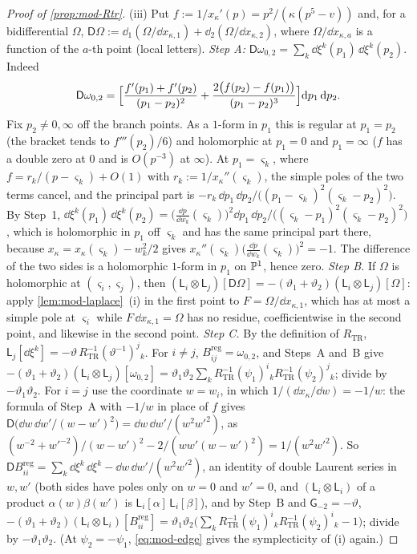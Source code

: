 \begin{proof}[Proof of \cref{prop:mod-Rtr}]
(iii) Put $f:=1/x_\kappa'(p)=p^2/(\kappa(p^5-v))$ and, for a bidifferential $\Omega$, $\mathsf D\Omega:=\dd_1(\Omega/\dd x_{\kappa,1})+\dd_2(\Omega/\dd x_{\kappa,2})$, where $\Omega/\dd x_{\kappa,a}$ is a function of the $a$-th point (local letters). \emph{Step A:} $\mathsf D\omega_{0,2}=\sum_k\dd\xi^k(p_1)\,\dd\xi^k(p_2)$. Indeed
\[
\mathsf D\omega_{0,2}=\Bigl[\frac{f'(p_1)+f'(p_2)}{(p_1-p_2)^2}+\frac{2\bigl(f(p_2)-f(p_1)\bigr)}{(p_1-p_2)^3}\Bigr]\mathrm{d} p_1\,\mathrm{d} p_2 .
\]
Fix $p_2\neq0,\infty$ off the branch points. As a $1$-form in $p_1$ this is regular at $p_1=p_2$ (the bracket tends to $f'''(p_2)/6$) and holomorphic at $p_1=0$ and $p_1=\infty$ ($f$ has a double zero at $0$ and is $O(p^{-3})$ at $\infty$). At $p_1=\varsigma_k$, where $f=r_k/(p-\varsigma_k)+O(1)$ with $r_k:=1/x_\kappa''(\varsigma_k)$, the simple poles of the two terms cancel, and the principal part is $-r_k\,\dd p_1\,\dd p_2/\bigl((p_1-\varsigma_k)^2(\varsigma_k-p_2)^2\bigr)$. By Step~1, $\dd\xi^k(p_1)\,\dd\xi^k(p_2)=\bigl(\tfrac{\dd p}{\dd w_k}(\varsigma_k)\bigr)^2\dd p_1\,\dd p_2/\bigl((\varsigma_k-p_1)^2(\varsigma_k-p_2)^2\bigr)$, which is holomorphic in $p_1$ off $\varsigma_k$ and has the same principal part there, because $x_\kappa=x_\kappa(\varsigma_k)-w_k^2/2$ gives $x_\kappa''(\varsigma_k)\bigl(\tfrac{\dd p}{\dd w_k}(\varsigma_k)\bigr)^2=-1$. The difference of the two sides is a holomorphic $1$-form in $p_1$ on $\mathbb{P}^1$, hence zero. \emph{Step B.} If $\Omega$ is holomorphic at $(\varsigma_i,\varsigma_j)$, then $(\mathsf L_i\otimes\mathsf L_j)[\mathsf D\Omega]=-(\vartheta_1+\vartheta_2)(\mathsf L_i\otimes\mathsf L_j)[\Omega]$: apply \cref{lem:mod-laplace}~(i) in the first point to $F=\Omega/\dd x_{\kappa,1}$, which has at most a simple pole at $\varsigma_i$ while $F\,\dd x_{\kappa,1}=\Omega$ has no residue, coefficientwise in the second point, and likewise in the second point. \emph{Step C.} By the definition of $R_{\mathrm{TR}}$, $\mathsf L_j[\dd\xi^k]=-\vartheta\,R_{\mathrm{TR}}^{-1}(\vartheta^{-1})^j{}_k$. For $i\neq j$, $B^{\mathrm{reg}}_{ij}=\omega_{0,2}$, and Steps~A and~B give $-(\vartheta_1+\vartheta_2)(\mathsf L_i\otimes\mathsf L_j)[\omega_{0,2}]=\vartheta_1\vartheta_2\sum_kR_{\mathrm{TR}}^{-1}(\psi_1)^i{}_kR_{\mathrm{TR}}^{-1}(\psi_2)^j{}_k$; divide by $-\vartheta_1\vartheta_2$. For $i=j$ use the coordinate $w=w_i$, in which $1/(\dd x_\kappa/\dd w)=-1/w$: the formula of Step~A with $-1/w$ in place of $f$ gives $\mathsf D\bigl(\dd w\,\dd w'/(w-w')^2\bigr)=\dd w\,\dd w'/(w^2w'^2)$, as $(w^{-2}+w'^{-2})/(w-w')^2-2/(ww'(w-w')^2)=1/(w^2w'^2)$. So $\mathsf DB^{\mathrm{reg}}_{ii}=\sum_k\dd\xi^k\,\dd\xi^k-\dd w\,\dd w'/(w^2w'^2)$, an identity of double Laurent series in $w,w'$ (both sides have poles only on $w=0$ and $w'=0$, and $(\mathsf L_i\otimes\mathsf L_i)$ of a product $\alpha(w)\beta(w')$ is $\mathsf L_i[\alpha]\,\mathsf L_i[\beta]$), and by Step~B and $\mathsf G_{-2}=-\vartheta$, $-(\vartheta_1+\vartheta_2)(\mathsf L_i\otimes\mathsf L_i)[B^{\mathrm{reg}}_{ii}]=\vartheta_1\vartheta_2\bigl(\sum_kR_{\mathrm{TR}}^{-1}(\psi_1)^i{}_kR_{\mathrm{TR}}^{-1}(\psi_2)^i{}_k-1\bigr)$; divide by $-\vartheta_1\vartheta_2$. (At $\psi_2=-\psi_1$, \eqref{eq:mod-edge} gives the symplecticity of (i) again.)
\end{proof}

